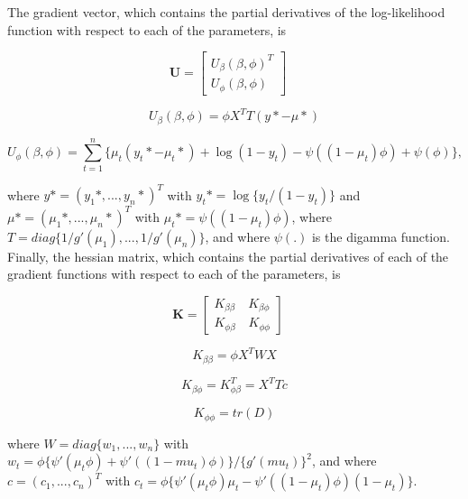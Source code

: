 \documentclass{svproc}
\begin{document}
The gradient vector, which contains the partial derivatives of the log-likelihood function with respect to each of the parameters, is

$$
\mathbf{U} = \begin{bmatrix}
U_{\beta} (\beta, \phi)^T \\
U_{\phi} (\beta, \phi)
\end{bmatrix}
\quad
$$

\bigskip

\begin{equation}
U_{\beta}(\beta,\phi) = \phi X^T T (y*-\mu*)
\end{equation}

\begin{equation}
U_{\phi}(\beta,\phi) = \sum_{t=1}^{n} \{ \mu_t(y_t*-\mu_t*) + \log(1-y_t) - \psi ((1-\mu_t)\phi) + \psi(\phi)\},
\end{equation}

\bigskip

where $y*=(y_1*,...,y_n*)^T$ with $y_t*=\log \{ y_t/(1-y_t)\}$ and $\mu*=(\mu_1*,...,\mu_n*)^T$ with $\mu_t*=\psi((1-\mu_t)\phi)$, where $T =diag\{1/g'(\mu_1),...,1/g'(\mu_n)\}$, and where $\psi(.)$ is the digamma function. Finally, the hessian matrix, which contains the partial derivatives of each of the gradient functions with respect to each of the parameters, is 

$$
\mathbf{K} = \begin{bmatrix}
K_{\beta \beta} \quad K_{\beta \phi} \\
K_{\phi \beta} \quad K_{\phi \phi} 
\end{bmatrix}
\quad
$$

\bigskip

\begin{equation}
K_{\beta \beta} = \phi X^T W X
\end{equation}

\begin{equation}
K_{\beta \phi} = K_{\phi \beta}^T = X^T T c
\end{equation}

\begin{equation}
K_{\phi \phi} = tr(D)
\end{equation}

\bigskip

where $W = diag\{w_1,...,w_n\}$ with $w_t = \phi\{\psi'(\mu_t \phi) + \psi'((1-mu_t)\phi)\}/\{g'(mu_t)\}^2$, and where $c = (c_1,...,c_n)^T$ with $c_t = \phi\{\psi'(\mu_t \phi)\mu_t - \psi'((1-\mu_t)\phi)(1-\mu_t)\}$. 
\end{document}
